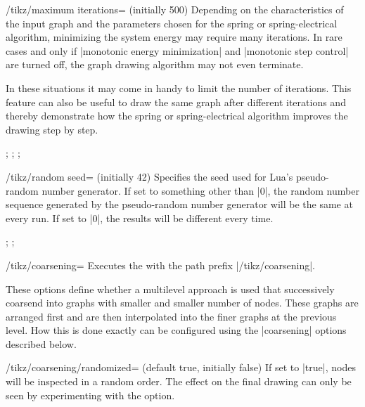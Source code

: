 \begin{key}{/tikz/maximum iterations= (initially 500)}
  Depending on the characteristics of the input graph and the parameters
  chosen for the spring or spring-electrical algorithm, minimizing the
  system energy may require many iterations. In rare cases and only if
  |monotonic energy minimization| and |monotonic step control| are
  turned off, the graph drawing algorithm may not even terminate.

  In these situations it may come in handy to limit the number of
  iterations. This feature can also be useful to draw the same graph
  after different iterations and thereby demonstrate how the spring or
  spring-electrical algorithm improves the drawing step by step.
  \begin{codeexample}[]
\tikz {};
\tikz {};
\tikz {};
  \end{codeexample}
\end{key}

\begin{key}{/tikz/random seed= (initially 42)}
  Specifies the seed used for Lua's pseudo-random number generator. If
  set to something other than |0|, the random number sequence generated
  by the pseudo-random number generator will be the same at every run.
  If set to |0|, the results will be different every time.
  \begin{codeexample}[width=5.5cm]
\tikz {};
\tikz {};
  \end{codeexample}
\end{key}

\begin{key}{/tikz/coarsening=}
  Executes the  with the path prefix |/tikz/coarsening|.
  
  These options define whether a multilevel approach is used that
  successively coarsend into graphs with smaller and smaller number
  of nodes. These graphs are arranged first and are then interpolated
  into the finer graphs at the previous level. How this is done exactly
  can be configured using the |coarsening| options described below.
\end{key}

\begin{key}{/tikz/coarsening/randomized= (default
  true, initially false)}
  If set to |true|, nodes will be inspected in a random order. The
  effect on the final drawing can only be seen by experimenting with the
  option.
  \begin{codeexample}[]
  \end{codeexample}
\end{key}

